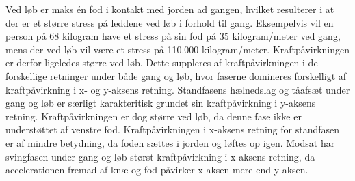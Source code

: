 Ved løb er maks én fod i kontakt med jorden ad gangen, hvilket resulterer i at der er et større stress på leddene ved løb i forhold til gang. Eksempelvis vil en person på 68 kilogram have et stress på sin fod på 35 kilogram/meter ved gang, mens der ved løb vil være et stress på 110.000 kilogram/meter. Kraftpåvirkningen er derfor ligeledes større ved løb. \citep{Adelaar1986} Dette suppleres af kraftpåvirkningen i de forskellige retninger under både gang og løb, hvor faserne domineres forskelligt af kraftpåvirkning i x- og y-aksens retning. \newline 
Standfasens hælnedslag og tåafsæt under gang og løb  er særligt karakteritisk grundet sin kraftpåvirkning i y-aksens retning. Kraftpåvirkningen er dog større ved løb, da denne fase ikke er understøttet af venstre fod. Kraftpåvirkningen i x-aksens retning for standfasen er af mindre betydning, da foden sættes i jorden og løftes op igen. Modsat har svingfasen under gang og løb størst kraftpåvirkning i x-aksens retning, da accelerationen fremad af knæ og fod påvirker x-aksen mere end y-aksen. \citep{Rueterbories2010} 


